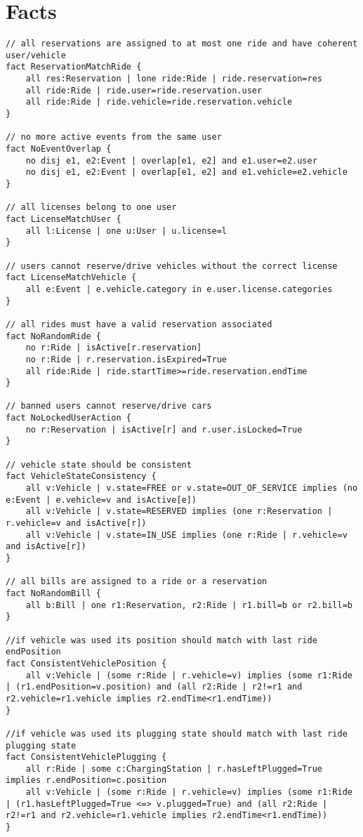 \section{Facts}
\begin{lstlisting}
// all reservations are assigned to at most one ride and have coherent user/vehicle
fact ReservationMatchRide {
	all res:Reservation | lone ride:Ride | ride.reservation=res
    all ride:Ride | ride.user=ride.reservation.user
	all ride:Ride | ride.vehicle=ride.reservation.vehicle
}

// no more active events from the same user
fact NoEventOverlap {
	no disj e1, e2:Event | overlap[e1, e2] and e1.user=e2.user 
	no disj e1, e2:Event | overlap[e1, e2] and e1.vehicle=e2.vehicle 
}

// all licenses belong to one user
fact LicenseMatchUser {
	all l:License | one u:User | u.license=l
}

// users cannot reserve/drive vehicles without the correct license 
fact LicenseMatchVehicle {
	all e:Event | e.vehicle.category in e.user.license.categories
}

// all rides must have a valid reservation associated
fact NoRandomRide {
	no r:Ride | isActive[r.reservation]
	no r:Ride | r.reservation.isExpired=True
	all ride:Ride | ride.startTime>=ride.reservation.endTime
}

// banned users cannot reserve/drive cars
fact NoLockedUserAction {
	no r:Reservation | isActive[r] and r.user.isLocked=True
}

// vehicle state should be consistent
fact VehicleStateConsistency {
	all v:Vehicle | v.state=FREE or v.state=OUT_OF_SERVICE implies (no e:Event | e.vehicle=v and isActive[e])
	all v:Vehicle | v.state=RESERVED implies (one r:Reservation | r.vehicle=v and isActive[r])
	all v:Vehicle | v.state=IN_USE implies (one r:Ride | r.vehicle=v and isActive[r])
}

// all bills are assigned to a ride or a reservation
fact NoRandomBill {
	all b:Bill | one r1:Reservation, r2:Ride | r1.bill=b or r2.bill=b
}

//if vehicle was used its position should match with last ride endPosition
fact ConsistentVehiclePosition {
	all v:Vehicle | (some r:Ride | r.vehicle=v) implies (some r1:Ride | (r1.endPosition=v.position) and (all r2:Ride | r2!=r1 and r2.vehicle=r1.vehicle implies r2.endTime<r1.endTime))  
}

//if vehicle was used its plugging state should match with last ride plugging state
fact ConsistentVehiclePlugging {
	all r:Ride | some c:ChargingStation | r.hasLeftPlugged=True implies r.endPosition=c.position
	all v:Vehicle | (some r:Ride | r.vehicle=v) implies (some r1:Ride | (r1.hasLeftPlugged=True <=> v.plugged=True) and (all r2:Ride | r2!=r1 and r2.vehicle=r1.vehicle implies r2.endTime<r1.endTime))
}


\end{lstlisting}

